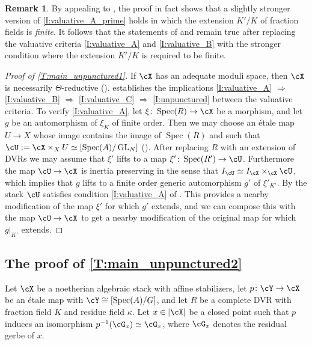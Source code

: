 \documentclass[a4paper]{amsart}
\numberwithin{equation}{section}
\theoremstyle{plain}
\theoremstyle{definition}
\newtheorem{remark}[thm]{Remark}
\DeclareMathOperator{\Spec}{Spec}
\DeclareMathOperator{\GL}{GL}
\newcommand{\co}{\colon}
\begin{document}
\begin{remark}
By appealing to , the proof in fact shows that a slightly stronger version of \ref{I:valuative_A_prime} holds in which the extension $K'/K$ of fraction fields is {\it finite}.  It follows that the statements of  and  remain true after replacing the valuative criteria \eqref{I:valuative_A} and \eqref{I:valuative_B} with the stronger condition where the extension $K'/K$ is required to be finite.
\end{remark}

\begin{proof}[Proof of \eqref{T:main_unpunctured1}]
If $\cX$ has an adequate moduli space, then $\cX$ is necessarily $\Theta$-reductive ().   establishes the implications \eqref{I:valuative_A} $\Rightarrow$ \eqref{I:valuative_B} $\Rightarrow$  \eqref{I:valuative_C} $\Rightarrow$  \eqref{I:unpunctured} between the valuative criteria.  To verify \eqref{I:valuative_A}, let $\xi \co \Spec(R) \to \cX$ be a morphism, and let $g$ be an automorphism of $\xi_K$ of finite order. Then we may choose an \'etale map $U \to X$ whose image contains the image of $\Spec(R)$ and such that $\cU := \cX \times_X U \simeq [\Spec(A)/\GL_N]$ ().  After replacing $R$ with an extension of DVRs we may assume that $\xi'$ lifts to a map $\xi' \co \Spec(R') \to \cU$. Furthermore the map $\cU \to \cX$ is inertia preserving in the sense that $I_\cU \simeq I_\cX \times_\cX \cU$, which implies that $g$ lifts to a finite order generic automorphism $g'$ of $\xi'_{K'}$. By  the stack $\cU$ satisfies condition \eqref{I:valuative_A} of . This provides a nearby modification of the map $\xi'$ for which $g'$ extends, and we can compose this with the map $\cU \to \cX$ to get a nearby modification of the original map for which $g|_{K'}$ extends.
\end{proof}


\subsection{The proof of \texorpdfstring{\eqref{T:main_unpunctured2}}{Theorem}}
Let $\cX$ be a noetherian algebraic stack with affine stabilizers, let $p \co \cY \to \cX$ be an \'etale map with $\cY \cong [\Spec(A)/G]$, and let $R$ be a complete DVR with fraction field $K$ and residue field $\kappa$. Let $x \in |\cX|$ be a closed point such that $p$ induces an isomorphism $p^{-1}(\cG_x) \simeq \cG_x$, where $\cG_x$ denotes the residual gerbe of $x$.
\end{document}
